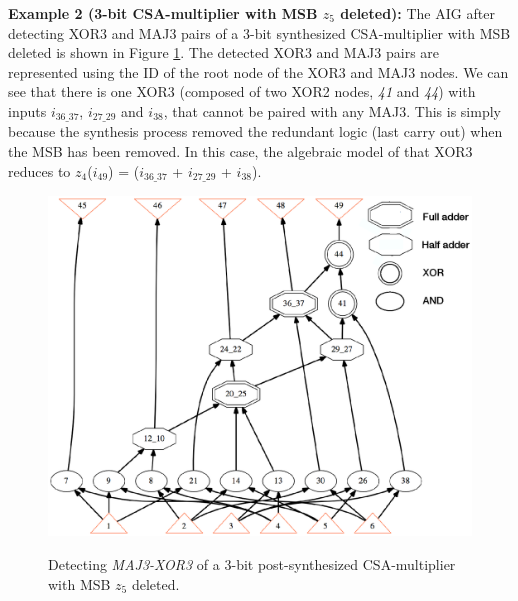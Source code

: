 \textbf{Example 2 (3-bit CSA-multiplier with MSB $z_{5}$ deleted):} The AIG after detecting XOR3 and MAJ3 pairs of a 3-bit synthesized CSA-multiplier with MSB deleted is shown in Figure \ref{fig:3-bit-aig}. The detected XOR3 and MAJ3 pairs are represented using the ID of the root node of the XOR3 and MAJ3 nodes. We can see that there is one XOR3 (composed of two XOR2 nodes, \textit{41} and \textit{44}) with inputs $i_{36\_37}$, $i_{27\_29}$ and $i_{38}$, that cannot be paired with any MAJ3. This is simply because the synthesis process removed the redundant logic (last carry out) when the MSB has been removed. In this case, the algebraic model of that XOR3 reduces to $z_{4}$($i_{49}$) = ($i_{36\_37}$ + $i_{27\_29}$ + $i_{38}$).



\begin{figure}[t] 
\begin{center}
\includegraphics[scale=0.39]{../figs/truncate-mult3-new.eps}
\caption{\color{red}Detecting \textit{MAJ3-XOR3} of a 3-bit post-synthesized CSA-multiplier with MSB $z_{5}$ deleted.}
\vspace{-7mm}
\label{fig:3-bit-aig}
\end{center}
\end{figure}












